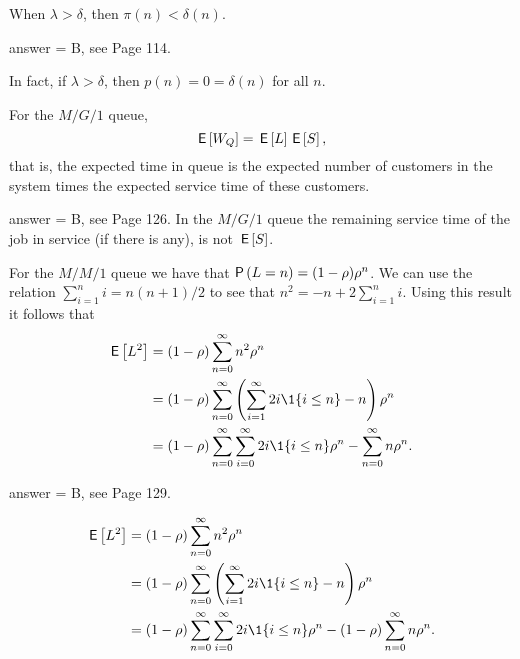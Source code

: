 \begin{exercise}[201903]
  When $\lambda > \delta$, then $\pi(n) < \delta(n)$.

\begin{solution}
  answer = B, see Page 114.

  In fact, if $\lambda>\delta$, then $p(n) = 0 = \delta(n)$ for all $n$. 
\end{solution}
\end{exercise}

\begin{exercise}[201903]
  For the $M/G/1$ queue, 
  \begin{equation*}
    \,\mathsf{E}\left[W_Q\right] = \,\mathsf{E}\left[L\right] \,\mathsf{E}\left[S\right],
  \end{equation*}
  that is, the expected time in queue is the expected number of customers in the system times the expected service time of these customers. 
\begin{solution}
answer = B, see Page 126.  In the $M/G/1$ queue the remaining service time of the job in service (if there is any), is not $\,\mathsf{E}\left[S\right]$.
\end{solution}
\end{exercise}

\begin{exercise}[201903]
  For the $M/M/1$ queue we have that $\P{L=n} = (1-\rho)\rho^n$.  We can use the relation 
  $\sum_{i=1}^n i= n(n+1)/2$ to see  that $n^2 = -n + 2\sum_{i=1}^n i$. Using this result it follows that
\begin{equation*}
\begin{split}
\E{L^2} &=  
    (1-\rho)\sum_{n=0}^\infty n^2 \rho^n  \\
&=    (1-\rho) \sum_{n=0}^\infty \left(\sum_{i=1}^\infty 2i \1{i\leq n}  - n\right)\rho^n \\
&=    (1-\rho) \sum_{n=0}^\infty \sum_{i=0}^\infty 2i\1{i\leq n}\rho^n  - \sum_{n=0}^\infty n\rho^n. 
\end{split}
\end{equation*}

\begin{solution}
answer = B, see Page 129.

\begin{equation*}
\begin{split}
\E{L^2} &=  
    (1-\rho)\sum_{n=0}^\infty n^2 \rho^n \\
&=    (1-\rho) \sum_{n=0}^\infty \left(\sum_{i=1}^\infty 2i \1{i\leq n}  - n\right)\rho^n \\
&=    (1-\rho) \sum_{n=0}^\infty \sum_{i=0}^\infty 2i\1{i\leq n}\rho^n  - (1-\rho) \sum_{n=0}^\infty n\rho^n. 
\end{split}
\end{equation*}



\end{solution}
\end{exercise}

